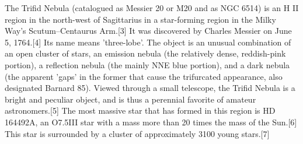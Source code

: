 The Trifid Nebula (catalogued as Messier 20 or M20 and as NGC 6514) is an H II region in the north-west of Sagittarius in a star-forming region in the Milky Way's Scutum–Centaurus Arm.[3] It was discovered by Charles Messier on June 5, 1764.[4] Its name means 'three-lobe'. The object is an unusual combination of an open cluster of stars, an emission nebula (the relatively dense, reddish-pink portion), a reflection nebula (the mainly NNE blue portion), and a dark nebula (the apparent 'gaps' in the former that cause the trifurcated appearance, also designated Barnard 85). Viewed through a small telescope, the Trifid Nebula is a bright and peculiar object, and is thus a perennial favorite of amateur astronomers.[5] The most massive star that has formed in this region is HD 164492A, an O7.5III star with a mass more than 20 times the mass of the Sun.[6] This star is surrounded by a cluster of approximately 3100 young stars.[7]


